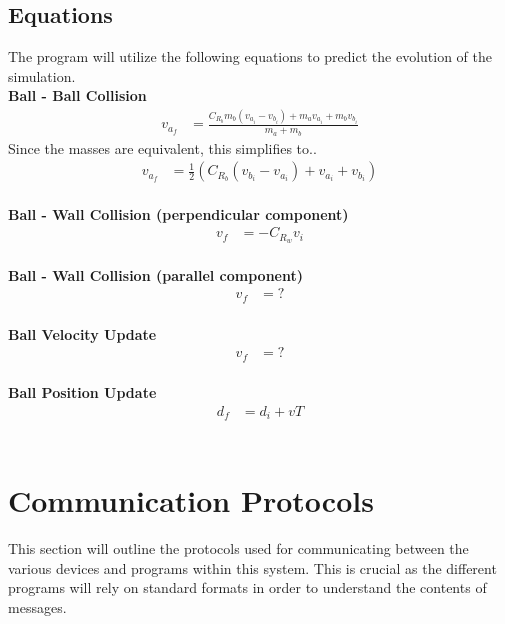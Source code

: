 \documentclass[titlepage]{article}
\begin{document}
\subsection{Equations}
The program will utilize the following equations to predict the evolution of the simulation.\\[4mm]
\textbf{Ball - Ball Collision}\\
{\large
\begin{align*}
	v_{a_f}	&= \frac{C_{R_b}m_b(v_{a_i} - v_{b_i}) + m_av_{a_i} + m_bv_{b_i}}{m_a + m_b}
\end{align*}
}
Since the masses are equivalent, this simplifies to..
{\large
\begin{align}
	v_{a_f}	&= \frac{1}{2}(C_{R_b}(v_{b_i} - v_{a_i}) + v_{a_i} + v_{b_i})
\end{align}
}\\
\textbf{Ball - Wall Collision (perpendicular component)}%
{\large
\begin{align}
	v_f	&= -C_{R_w}v_i
\end{align}
}\\
\textbf{Ball - Wall Collision (parallel component)}
{\large
\begin{align}
	v_f	&= ?%
\end{align}
}\\
\textbf{Ball Velocity Update}
{\large
\begin{align}
	v_f	&= ?%
\end{align}
}\\
\textbf{Ball Position Update}
{\large
\begin{align}
	d_f	&= d_i + vT
\end{align}
}\\

\section{Communication Protocols}
This section will outline the protocols used for communicating between the various devices and programs within this system. This is crucial as the different programs will rely on standard formats in order to understand the contents of messages.
\end{document}
